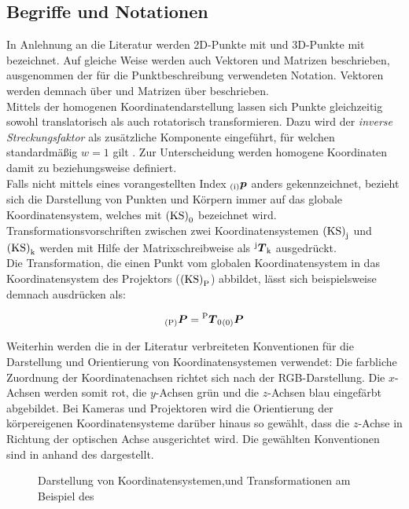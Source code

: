 \subsection{Begriffe und Notationen}
In Anlehnung an die Literatur \cite{Zhang2000} werden 2D-Punkte mit  und 3D-Punkte mit  bezeichnet. Auf gleiche Weise werden auch Vektoren und Matrizen beschrieben, ausgenommen der für die Punktbeschreibung verwendeten Notation. Vektoren werden demnach über  und Matrizen über  beschrieben.\\
Mittels der homogenen Koordinatendarstellung lassen sich Punkte gleichzeitig sowohl translatorisch als auch rotatorisch transformieren. Dazu wird der \textit{inverse Streckungsfaktor} als zusätzliche Komponente eingeführt, für welchen standardmäßig $w=1$ gilt \cite{Nischwitz20111}. Zur Unterscheidung werden homogene Koordinaten damit zu  beziehungsweise  definiert.\\
Falls nicht mittels eines vorangestellten Index ${_{{\mathrm{(i)}}}}\mbox{\boldmath{$p$}}$ anders gekennzeichnet, bezieht sich die Darstellung von Punkten und Körpern immer auf das globale Koordinatensystem, welches mit ${\mathrm{(KS)}}_{\mathrm{0}}$ bezeichnet wird. Transformationsvorschriften zwischen zwei Koordinatensystemen ${\mathrm{(KS)}}_{\mathrm{j}}$ und ${\mathrm{(KS)}}_{\mathrm{k}}$ werden mit Hilfe der Matrixschreibweise als ${^{\mathrm{j}}\mbox{\boldmath{$T$}}_{\mathrm{k}}}$ ausgedrückt.\\
Die Transformation, die einen Punkt vom globalen Koordinatensystem in das Koordinatensystem des Projektors (${\mathrm{(KS)}}_{\mathrm{P}}$) abbildet, lässt sich beispielsweise demnach ausdrücken als:

\begin{equation}
{_{{\mathrm{(P)}}}}\mbox{\boldmath{$P$}} = {^{\mathrm{P}}\mbox{\boldmath{$T$}}_{\mathrm{0}}}{_{{\mathrm{(0)}}}}\mbox{\boldmath{$P$}}
\end{equation}

Weiterhin werden die in der Literatur verbreiteten Konventionen für die Darstellung und Orientierung von Koordinatensystemen verwendet: Die farbliche Zuordnung der Koordinatenachsen richtet sich nach der RGB-Darstellung. Die $x$-Achsen werden somit rot, die $y$-Achsen grün und die $z$-Achsen blau eingefärbt abgebildet. Bei Kameras und Projektoren wird die Orientierung der körpereigenen Koordinatensysteme darüber hinaus so gewählt, dass die $z$-Achse in Richtung der optischen Achse ausgerichtet wird. Die gewählten Konventionen sind in  anhand des  dargestellt.

\begin{figure}[ht]
	\begin{center}%
		\caption{Darstellung von Koordinatensystemen,\red[ Punkten] und Transformationen am Beispiel des }
		\label{fig.coords}
	\end{center}
\end{figure}


